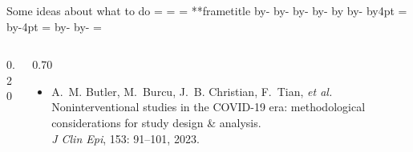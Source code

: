 \documentclass[aspectratio=169,12pt]{beamer} %
\makeatletter
\newif\ifsidebartheme
\newcommand*{\calculatespace}{%
    \contentheight=\paperheight%
    \ifx\beamer@frametitle\@empty%
        \setbox\@tempboxa=\box\voidb@x%
      \else%
        \setbox\@tempboxa=\vbox{%
          \vbox{}%
          {\parskip0pt\usebeamertemplate***{frametitle}}%
        }%
        \ifsidebartheme%
          \advance\contentheight by-1em%
        \fi%
      \fi%
    \advance\contentheight by-\ht\@tempboxa%
    \advance\contentheight by-\dp\@tempboxa%
    \advance\contentheight by-\beamer@frametopskip%
    \ifbeamer@plainframe%
    \contentbottom=0pt%
    \else%
    \advance\contentheight by-\headheight%
    \advance\contentheight by\headdp%
    \advance\contentheight by-\footheight%
    \advance\contentheight by4pt%
    \contentbottom=\footheight%
    \advance\contentbottom by-4pt%
    \fi%
    \contentwidth=\paperwidth%
    \ifbeamer@plainframe%
    \contentleft=0pt%
    \else%
    \advance\contentwidth by-\beamer@rightsidebar%
    \advance\contentwidth by-\beamer@leftsidebar\relax%
    \contentleft=\beamer@leftsidebar%
    \fi%
}
\makeatother
\begin{document}
\begin{frame}{Some ideas about what to do}
\calculatespace%
\begin{columns}
\begin{column}{0.20\contentwidth}
\end{column}
\begin{column}{0.70\contentwidth}
	\begin{itemize}
		\item A.~M. Butler, M.~Burcu, J.~B. Christian, F.~Tian,
		\emph{et al.} Noninterventional studies in the {COVID-19} era:
		methodological considerations for study design \& analysis. \\
		\emph{J Clin Epi}, 153: 91--101, 2023.
\nocite{butler_2023}
	\end{itemize}
\end{column}
\end{columns}
\end{frame}
\end{document}
